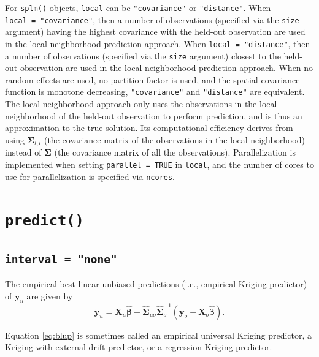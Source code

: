 \documentclass{article}
\begin{document}
For \texttt{splm()} objects, \texttt{local} can be \texttt{"covariance"}
or \texttt{"distance"}. When \texttt{local\ =\ "covariance"}, then a
number of observations (specified via the \texttt{size} argument) having
the highest covariance with the held-out observation are used in the
local neighborhood prediction approach. When
\texttt{local\ =\ "distance"}, then a number of observations (specified
via the \texttt{size} argument) closest to the held-out observation are
used in the local neighborhood prediction approach. When no random
effects are used, no partition factor is used, and the spatial
covariance function is monotone decreasing, \texttt{"covariance"} and
\texttt{"distance"} are equivalent. The local neighborhood approach only
uses the observations in the local neighborhood of the held-out
observation to perform prediction, and is thus an approximation to the
true solution. Its computational efficiency derives from using
\(\boldsymbol{\Sigma}_{l, l}\) (the covariance matrix of the
observations in the local neighborhood) instead of
\(\boldsymbol{\Sigma}\) (the covariance matrix of all the observations).
Parallelization is implemented when setting \texttt{parallel\ =\ TRUE}
in \texttt{local}, and the number of cores to use for parallelization is
specified via \texttt{ncores}.

\hypertarget{sec:predict}{%
\section{\texorpdfstring{\texttt{predict()}}{predict()}}\label{sec:predict}}

\hypertarget{interval-none}{%
\subsection{\texorpdfstring{\texttt{interval\ =\ "none"}}{interval = "none"}}\label{interval-none}}

The empirical best linear unbiased predictions (i.e., empirical Kriging
predictor) of \(\mathbf{y}_u\) are given by
\begin{equation}\label{eq:blup}
  \mathbf{\dot{y}}_u =  \mathbf{X}_u \hat{\boldsymbol{\beta}} + \hat{\boldsymbol{\Sigma}}_{uo} \hat{\boldsymbol{\Sigma}}^{-1}_{o} (\mathbf{y}_o - \mathbf{X}_o \hat{\boldsymbol{\beta}}) .
\end{equation}

Equation \ref{eq:blup} is sometimes called an empirical universal
Kriging predictor, a Kriging with external drift predictor, or a
regression Kriging predictor.
\end{document}
